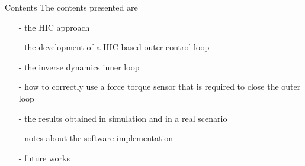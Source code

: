 \begin{frame}{Contents}
  The contents presented are
  \begin{itemize}
  \item[-] the HIC approach
  \item[-] the development of a HIC based outer control loop
  \item[-] the inverse dynamics inner loop
  \item[-] how to correctly use a force torque sensor that is required to close the outer loop
  \item[-] the results obtained in simulation and in a real scenario
  \item[-] notes about the software implementation
  \item[-] future works
  \end{itemize}
\end{frame}

